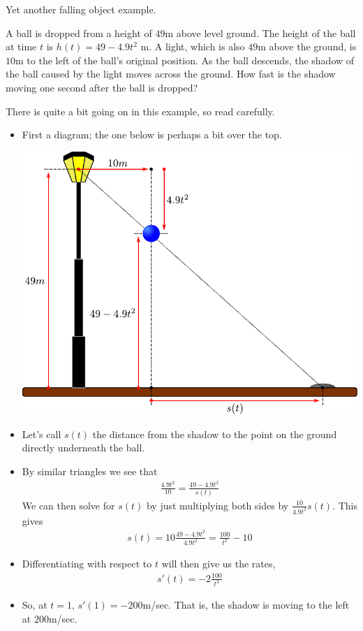 Yet another falling object example.
\begin{eg}\label{eg:fallingBall}
A ball is dropped from a height of $49$m above level ground. The
height of the ball at time $t$ is $h(t)=49-4.9 t^2$ m. A light,
which is also $49$m above the ground, is $10$m to the left of
the ball's original position. As the ball descends, the shadow
of the ball caused by the light moves across the ground. How
fast is the shadow moving one second after the ball is dropped?

\soln There is quite a bit going on in this example, so read carefully.
\begin{itemize}
 \item First a diagram; the one below is perhaps a bit over the top.
\begin{efig}
\begin{center}
    \includegraphics{extra/falling_ball}
\end{center}
\end{efig}
\item Let's call $s(t)$ the distance from the shadow to the point
on the ground directly underneath the ball.

\item By similar triangles we see that
\begin{align*}
\frac{4.9 t^2}{10}=\frac{49-4.9 t^2}{s(t)}
\end{align*}
We can then solve for $s(t)$ by just multiplying both sides by
$\frac{10}{4.9 t^2}s(t)$. This gives
\begin{align*}
s(t)=10\frac{49-4.9 t^2}{4.9 t^2}=\frac{100}{t^2}-10
\end{align*}
\item Differentiating with respect to $t$ will then give us the rates,
\begin{align*}
s'(t)=-2\frac{100}{t^3}
\end{align*}
\item So, at $t=1$, $s'(1)=-200$m/sec. That is, the shadow is moving
to the left at $200$m/sec.
\end{itemize}

\end{eg}

